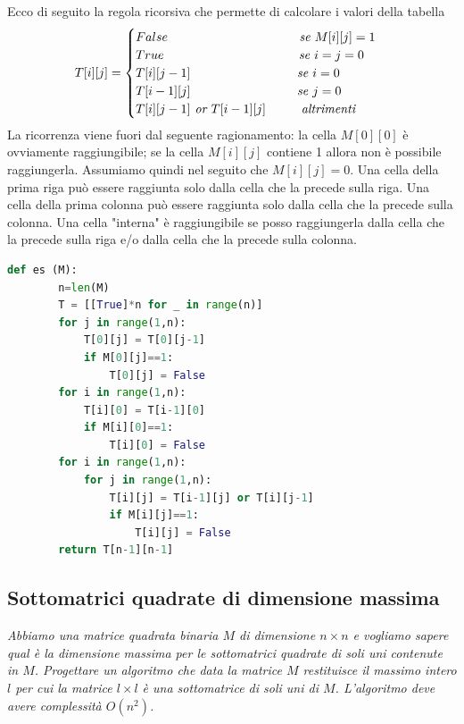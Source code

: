 Ecco di seguito la regola ricorsiva che permette di calcolare i valori della tabella
\begin{equation*}
    T[i][j]=
    \begin{cases}
        False\hspace{3.7cm}\textit{se }M[i][j]=1\\
        True\hspace{3.8cm}\textit{se }i=j=0\\
        T[i][j-1]\hspace{3cm}\textit{se }i=0\\
        T[i-1][j]\hspace{3cm}\textit{se }j=0\\
        T[i][j-1] \textit{ or } T[i-1][j]\hspace{1cm}\textit{altrimenti}
    \end{cases}
\end{equation*}
La ricorrenza viene fuori dal seguente ragionamento: la cella $M[0][0]$ è ovviamente raggiungibile; se la cella $M[i][j]$ contiene 1 allora non è possibile raggiungerla. Assumiamo quindi nel seguito che $M[i][j]=0$. Una cella della prima riga può essere raggiunta solo dalla cella che la precede sulla riga. Una cella della prima colonna può essere raggiunta solo dalla cella che la precede sulla colonna. Una cella "interna" è raggiungibile se posso raggiungerla dalla cella che la precede sulla riga e/o dalla cella che la precede sulla colonna.

\begin{lstlisting}[language=Python]
    def es (M):
        n=len(M)
        T = [[True]*n for _ in range(n)]
        for j in range(1,n):
            T[0][j] = T[0][j-1]
            if M[0][j]==1:
                T[0][j] = False
        for i in range(1,n):
            T[i][0] = T[i-1][0]
            if M[i][0]==1:
                T[i][0] = False
        for i in range(1,n):
            for j in range(1,n):
                T[i][j] = T[i-1][j] or T[i][j-1]
                if M[i][j]==1:
                    T[i][j] = False
        return T[n-1][n-1]
\end{lstlisting}

\subsection{Sottomatrici quadrate di dimensione massima}
\textit{Abbiamo una matrice quadrata binaria $M$ di dimensione $n\times n$ e vogliamo sapere qual è la dimensione massima per le sottomatrici quadrate di soli uni contenute in $M$. Progettare un algoritmo che data la matrice $M$ restituisce il massimo intero $l$ per cui la matrice $l\times l$ è una sottomatrice di soli uni di $M$. L'algoritmo deve avere complessità $O(n^2)$.}

